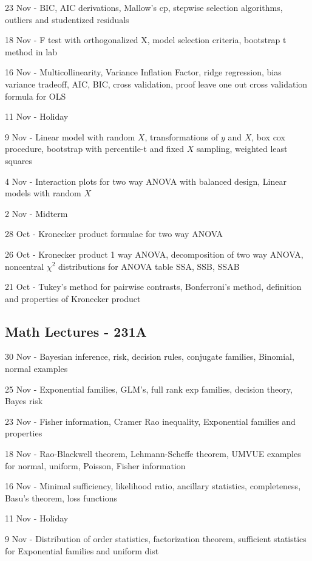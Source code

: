 \documentclass[10pt, twocolumn]{article}
\begin{document}
23 Nov - BIC, AIC derivations, Mallow's cp, stepwise selection algorithms,
outliers and studentized residuals

18 Nov - F test with orthogonalized X, model selection criteria,
bootstrap t method in lab

16 Nov - Multicollinearity, Variance Inflation Factor,
ridge regression, bias variance tradeoff, AIC, BIC, cross validation, proof leave
one out cross validation formula for OLS 

11 Nov - Holiday

9 Nov - Linear model with random $X$, transformations of $y$ and $X$, box
cox procedure, bootstrap with percentile-t and fixed $X$ sampling, weighted
least squares

4 Nov - Interaction plots for two way ANOVA with balanced design, Linear
models with random $X$

2 Nov - Midterm

28 Oct - Kronecker product formulae for two way ANOVA

26 Oct - Kronecker product 1 way ANOVA, decomposition of two way ANOVA,
noncentral $\chi^2$ distributions for ANOVA table SSA, SSB, SSAB

21 Oct - Tukey's method for pairwise contrasts, Bonferroni's method,
definition and properties of Kronecker product

\newpage

\subsection*{Math Lectures - 231A}

30 Nov - Bayesian inference, risk, decision rules, conjugate families,
Binomial, normal examples

25 Nov - Exponential families, GLM's, full rank exp families, decision
theory, Bayes risk

23 Nov - Fisher information, Cramer Rao inequality, Exponential families
and properties

18 Nov - Rao-Blackwell theorem, Lehmann-Scheffe theorem, UMVUE examples for
normal, uniform, Poisson, Fisher information

16 Nov - Minimal sufficiency, likelihood ratio, ancillary statistics,
completeness, Basu's theorem, loss functions

11 Nov - Holiday

9 Nov - Distribution of order statistics, factorization theorem, sufficient
statistics for Exponential families and uniform dist
\end{document}

